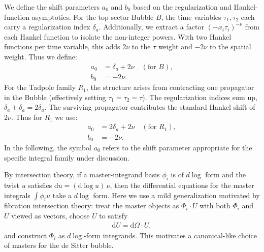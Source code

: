 \documentclass[a4paper,12pt]{article}
\newcommand{\n}{\nonumber}
\def\di{{\mathrm{d}}}
\begin{document}
We define the shift parameters $a_0$ and $b_0$ based on the regularization and Hankel-function asymptotics.
For the top-sector Bubble $B$, the time variables $\tau_1, \tau_2$ each carry a regularization index $\delta_a$. Additionally, we extract a factor $(-x_i \tau_i)^{-\nu}$ from each Hankel function to isolate the non-integer powers. With two Hankel functions per time variable, this adds $2\nu$ to the $\tau$ weight and $-2\nu$ to the spatial weight. Thus we define:
\begin{align}
	a_0 &= \delta_a + 2\nu \quad (\text{for } B), \n\\
	b_0 &= -2\nu.
\end{align}
For the Tadpole family $R_1$, the structure arises from contracting one propagator in the Bubble (effectively setting $\tau_1=\tau_2=\tau$). The regularization indices sum up, $\delta_a+\delta_a=2\delta_a$. The surviving propagator contributes the standard Hankel shift of $2\nu$. Thus for $R_1$ we use:
\begin{align}
	a_0 &= 2\delta_a + 2\nu \quad (\text{for } R_1), \n\\
	b_0 &= -2\nu.
\end{align}
In the following, the symbol $a_0$ refers to the shift parameter appropriate for the specific integral family under discussion.

By intersection theory, if a master-integrand basis $\phi_i$ is of $d\log$ form and the twist $u$ satisfies $\di u=(\di\log u)\,\nu$, then the differential equations for the master integrals $\int \phi_i u$ take a $d\log$ form. Here we use a mild generalization motivated by fibration intersection theory: treat the master objects as $\Phi_i\cdot U$ with both $\Phi_i$ and $U$ viewed as vectors, choose $U$ to satisfy
\begin{align}
	\di U = \di\Omega \cdot U,
\end{align}
and construct $\Phi_i$ as $d\log$-form integrands. This motivates a canonical-like choice of masters for the de Sitter bubble.
\end{document}
